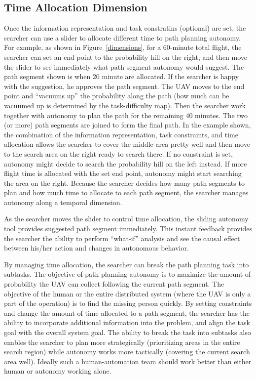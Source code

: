 \documentclass[journal]{IEEEtran}
\begin{document}
\subsection{Time Allocation Dimension}

Once the information representation and task constratins (optional) are set, the searcher can use a slider to allocate different time to path planning autonomy. For example, as shown in Figure~\ref{dimensions}, for a 60-minute total flight, the searcher can set an end point to the probability hill on the right, and then move the slider to see immediately what path segment autonomy would suggest. The path segment shown is when 20 minute are allocated. If the searcher is happy with the suggestion, he approves the path segment. The UAV moves to the end point and ``vacuums up'' the probability along the path (how much can be vacuumed up is determined by the task-difficulty map). Then the searcher work together with autonomy to plan the path for the remaining 40 minutes. The two (or more) path segments are joined to form the final path. In the example shown, the combination of the information representation, task constraints, and time allocation allows the searcher to cover the middle area pretty well and then move to the search area on the right ready to search there. If no constraint is set, autonomy might decide to search the probability hill on the left instead. If more flight time is allocated with the set end point, autonomy might start searching the area on the right. Because the searcher decides how many path segments to plan and how much time to allocate to each path segment, the searcher manages autonomy along a temporal dimension.

As the searcher moves the slider to control time allocation, the sliding autonomy tool provides suggested path segment immediately. This instant feedback provides the searcher the ability to perform ``what-if'' analysis and see the causal effect between his/her action and changes in autonomous behavior. 

By managing time allocation, the searcher can break the path planning task into subtasks. The objective of path planning autonomy is to maximize the amount of probability the UAV can collect following the current path segment. The objective of the human or the entire distributed system (where the UAV is only a part of the operation) is to find the missing person quickly. By setting constraints and change the amount of time allocated to a path segment, the searcher has the ability to incorporate additional information into the problem, and align the task goal with the overall system goal. The ability to break the task into subtasks also enables the searcher to plan more strategically (prioritizing areas in the entire search region) while autonomy works more tactically (covering the current search area well). Ideally such a human-automation team should work better than either human or autonomy working alone.
\end{document}
